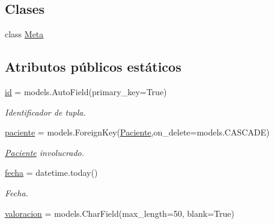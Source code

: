 \subsection*{Clases}
\begin{DoxyCompactItemize}
\item 
class \hyperlink{classappEmotionIOT_1_1models_1_1Diagnostico_1_1Meta}{Meta}
\end{DoxyCompactItemize}
\subsection*{Atributos públicos estáticos}
\begin{DoxyCompactItemize}
\item 
\hyperlink{classappEmotionIOT_1_1models_1_1Diagnostico_a77eecc398a02a80ab089cff22fbff37e}{id} = models.\+Auto\+Field(primary\+\_\+key=True)\hypertarget{classappEmotionIOT_1_1models_1_1Diagnostico_a77eecc398a02a80ab089cff22fbff37e}{}\label{classappEmotionIOT_1_1models_1_1Diagnostico_a77eecc398a02a80ab089cff22fbff37e}

\begin{DoxyCompactList}\small\item\em Identificador de tupla. \end{DoxyCompactList}\item 
\hyperlink{classappEmotionIOT_1_1models_1_1Diagnostico_a796fa97c25ee2ab6a6cde1fdf1e7b2b0}{paciente} = models.\+Foreign\+Key(\hyperlink{classappEmotionIOT_1_1models_1_1Paciente}{Paciente},on\+\_\+delete=models.\+C\+A\+S\+C\+A\+DE)\hypertarget{classappEmotionIOT_1_1models_1_1Diagnostico_a796fa97c25ee2ab6a6cde1fdf1e7b2b0}{}\label{classappEmotionIOT_1_1models_1_1Diagnostico_a796fa97c25ee2ab6a6cde1fdf1e7b2b0}

\begin{DoxyCompactList}\small\item\em \hyperlink{classappEmotionIOT_1_1models_1_1Paciente}{Paciente} involucrado. \end{DoxyCompactList}\item 
\hyperlink{classappEmotionIOT_1_1models_1_1Diagnostico_a71ad79cf99bef1beabffe0a2156947a6}{fecha} = datetime.\+today()\hypertarget{classappEmotionIOT_1_1models_1_1Diagnostico_a71ad79cf99bef1beabffe0a2156947a6}{}\label{classappEmotionIOT_1_1models_1_1Diagnostico_a71ad79cf99bef1beabffe0a2156947a6}

\begin{DoxyCompactList}\small\item\em Fecha. \end{DoxyCompactList}\item 
\hyperlink{classappEmotionIOT_1_1models_1_1Diagnostico_ad61d0251adf927f3a332c5b246ace24e}{valoracion} = models.\+Char\+Field(max\+\_\+length=50, blank=True)\hypertarget{classappEmotionIOT_1_1models_1_1Diagnostico_ad61d0251adf927f3a332c5b246ace24e}{}\label{classappEmotionIOT_1_1models_1_1Diagnostico_ad61d0251adf927f3a332c5b246ace24e}


\end{DoxyCompactItemize}
